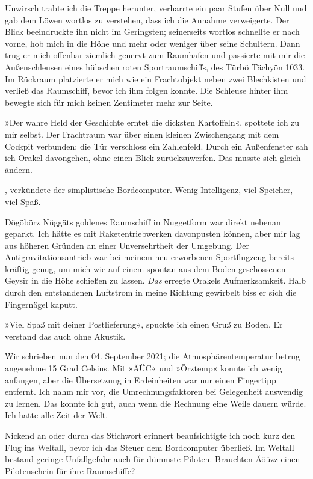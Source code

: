 Unwirsch trabte ich die Treppe herunter, verharrte ein paar Stufen über Null und gab dem Löwen wortlos zu verstehen, dass ich die Annahme verweigerte. Der Blick beeindruckte ihn nicht im Geringsten; seinerseits wortlos schnellte er nach vorne, hob mich in die Höhe und mehr oder weniger über seine Schultern. Dann trug er mich offenbar ziemlich genervt zum Raumhafen und passierte mit mir die Außenschleusen eines hübschen roten Sportraumschiffs, des Türbö Tächyön 1033. Im Rückraum platzierte er mich wie ein Frachtobjekt neben zwei Blechkisten und verließ das Raumschiff, bevor ich ihm folgen konnte. Die Schleuse hinter ihm bewegte sich für mich keinen Zentimeter mehr zur Seite.

»Der wahre Held der Geschichte erntet die dicksten Kartoffeln«, spottete ich zu mir selbst. Der Frachtraum war über einen kleinen Zwischengang mit dem Cockpit verbunden; die Tür verschloss ein Zahlenfeld. Durch ein Außenfenster sah ich Orakel davongehen, ohne einen Blick zurückzuwerfen. Das musste sich gleich ändern.

, verkündete der simplistische Bordcomputer. Wenig Intelligenz, viel Speicher, viel Spaß.

Dögöbörz Nüggäts goldenes Raumschiff in Nuggetform war direkt nebenan geparkt. Ich hätte es mit Raketentriebwerken davonpusten können, aber mir lag aus höheren Gründen an einer Unversehrtheit der Umgebung. Der Antigravitationsantrieb war bei meinem neu erworbenen Sportflugzeug bereits kräftig genug, um mich wie auf einem spontan aus dem Boden geschossenen Geysir in die Höhe schießen zu lassen. \emph{Das} erregte Orakels Aufmerksamkeit. Halb durch den entstandenen Luftstrom in meine Richtung gewirbelt biss er sich die Fingernägel kaputt.

»Viel Spaß mit deiner Postlieferung«, spuckte ich einen Gruß zu Boden. Er verstand das auch ohne Akustik.

Wir schrieben nun den 04. September 2021; die Atmosphärentemperatur betrug angenehme 15 Grad Celsius. Mit »ÄÜC« und »Örztemp« konnte ich wenig anfangen, aber die Übersetzung in Erdeinheiten war nur einen Fingertipp entfernt. Ich nahm mir vor, die Umrechnungsfaktoren bei Gelegenheit auswendig zu lernen. Das konnte ich gut, auch wenn die Rechnung eine Weile dauern würde. Ich hatte alle Zeit der Welt.

Nickend an oder durch das Stichwort erinnert beaufsichtigte ich noch kurz den Flug ins Weltall, bevor ich das Steuer dem Bordcomputer überließ. Im Weltall bestand geringe Unfallgefahr auch für dümmste Piloten. Brauchten Äöüzz einen Pilotenschein für ihre Raumschiffe?

